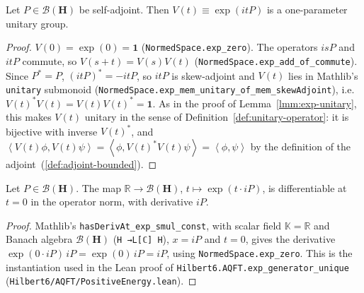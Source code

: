 \begin{lemma}
    \label{lmm:exp-bounded-unitary-group}
    \leanok
    Let $P \in \mathcal{B}(\mathbf{H})$ be self-adjoint. Then $V(t) \equiv \exp(itP)$ is a one-parameter unitary group.
\end{lemma}
\begin{proof}
    \leanok
    $V(0) = \exp(0) = \mathbf{1}$ (\texttt{NormedSpace.exp\_zero}). The operators $isP$ and $itP$ commute, so $V(s+t) = V(s)V(t)$ (\texttt{NormedSpace.exp\_add\_of\_commute}). Since $P^* = P$, $(itP)^* = -itP$, so $itP$ is skew-adjoint and $V(t)$ lies in Mathlib's \texttt{unitary} submonoid (\texttt{NormedSpace.exp\_mem\_unitary\_of\_mem\_skewAdjoint}), i.e. $V(t)^*V(t) = V(t)V(t)^* = \mathbf{1}$. As in the proof of Lemma~\ref{lmm:exp-unitary}, this makes $V(t)$ unitary in the sense of Definition~\ref{def:unitary-operator}: it is bijective with inverse $V(t)^*$, and $\left< V(t)\phi, V(t)\psi \right> = \left< \phi, V(t)^*V(t)\psi \right> = \left< \phi, \psi \right>$ by the definition of the adjoint~(\ref{def:adjoint-bounded}).
\end{proof}

\begin{lemma}
    \label{lmm:exp-bounded-hasDerivAt}
    \leanok
    Let $P \in \mathcal{B}(\mathbf{H})$. The map $\mathbb{R} \to \mathcal{B}(\mathbf{H})$, $t \mapsto \exp(t \cdot iP)$, is differentiable at $t = 0$ in the operator norm, with derivative $iP$.
\end{lemma}
\begin{proof}
    \leanok
    Mathlib's \texttt{hasDerivAt\_exp\_smul\_const}, with scalar field $\mathbb{K} = \mathbb{R}$ and Banach algebra $\mathcal{B}(\mathbf{H})$ (\texttt{H →L[ℂ] H}), $x = iP$ and $t = 0$, gives the derivative $\exp(0 \cdot iP)\,iP = \exp(0)\,iP = iP$, using \texttt{NormedSpace.exp\_zero}. This is the instantiation used in the Lean proof of \texttt{Hilbert6.AQFT.exp\_generator\_unique} (\texttt{Hilbert6/AQFT/PositiveEnergy.lean}).
\end{proof}

